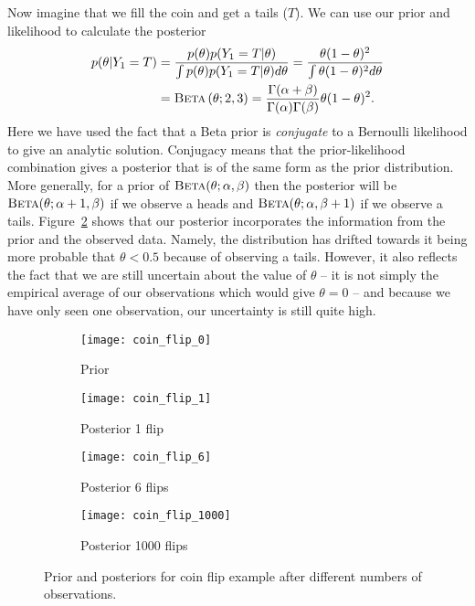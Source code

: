 Now imagine that we fill the coin and get a tails ($T$).  We can
use our prior and likelihood to calculate the posterior
\begin{align}
p(\theta | Y_1 = T) &= \frac{p(\theta) p(Y_1=T | \theta)}{\int p(\theta) p(Y_1=T | \theta) d\theta} = \frac{\theta (1-\theta)^2}{\int \theta (1-\theta)^2 d\theta} \nonumber \\
&= \textsc{Beta}\left(\theta ; 2,3\right) = 
\frac{\Gamma(\alpha+\beta)}{\Gamma (\alpha) \Gamma(\beta)} \theta (1-\theta)^2 \label{eq:prob:beta_post_1}.
\end{align}
Here we have used the fact that a Beta prior is \emph{conjugate} to a Bernoulli likelihood
to give an analytic solution.  Conjugacy means that the prior-likelihood combination gives
a posterior that is of the same form as the prior distribution.  More generally, for a prior of
$\textsc{Beta}(\theta ; \alpha, \beta)$ then the posterior will be $\textsc{Beta}(\theta ; \alpha+1, \beta)$
if we observe a heads and $\textsc{Beta}(\theta ; \alpha, \beta+1)$ if we observe a tails.
Figure~\ref{fig:inf:coin_flip:1} shows that our
posterior incorporates the information from the prior and the observed data.  Namely, the distribution
has drifted towards it being more probable that $\theta<0.5$ because of observing a tails.  However,
it also reflects the fact that we are still uncertain about the value of $\theta$ -- it is not simply the
empirical average of our observations which would give $\theta=0$ -- and because we have only
seen one observation, our uncertainty is still quite high.

\begin{figure}[t]
	\centering
	\begin{subfigure}[t]{0.24\textwidth}
		\texttt{[image: coin\_flip\_0]}
		\caption{Prior \label{fig:inf:coin_flip:0}}
	\end{subfigure}
	\begin{subfigure}[t]{0.24\textwidth}
		\texttt{[image: coin\_flip\_1]}
		\caption{Posterior 1 flip \label{fig:inf:coin_flip:1}}
	\end{subfigure}
	\begin{subfigure}[t]{0.24\textwidth}
		\texttt{[image: coin\_flip\_6]}
		\caption{Posterior 6 flips \label{fig:inf:coin_flip:6}}
	\end{subfigure}
	\begin{subfigure}[t]{0.24\textwidth}
		\texttt{[image: coin\_flip\_1000]}
		\caption{Posterior 1000 flips \label{fig:inf:coin_flip:1000}}
	\end{subfigure}
	\caption{Prior and posteriors for coin flip example after different numbers
		of observations.
		\label{fig:inf:coin_flip}}
\end{figure}

